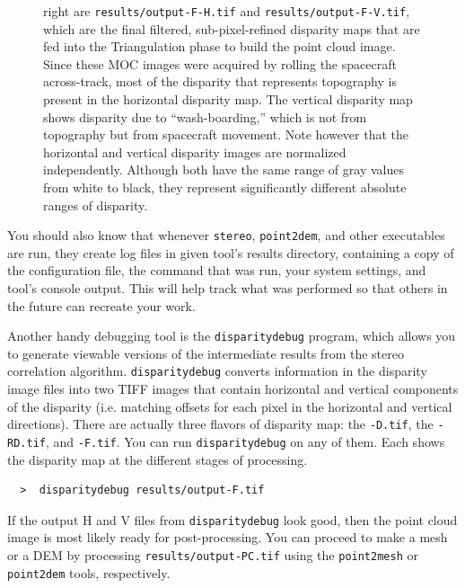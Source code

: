 \begin{figure}[b!]
\begin{minipage}{2.7in}
{        right are \texttt{results/output-F-H.tif} and
        \texttt{results/output-F-V.tif}, which are the final
        filtered, sub-pixel-refined disparity maps that are fed into the
        Triangulation phase to build the point cloud image.  Since
        these MOC images were acquired by rolling the spacecraft
        across-track, most of the disparity that represents topography
        is present in the horizontal disparity map.  The vertical
        disparity map shows disparity due to ``wash-boarding,'' which
        is not from topography but from spacecraft movement. Note
        however that the horizontal and vertical disparity images are
        normalized independently.  Although both have the same range
        of gray values from white to black, they represent
        significantly different absolute ranges of disparity.}
\end{minipage}
\end{figure}

You should also know that whenever \texttt{stereo}, \texttt{point2dem},
and other executables are run, they create log files in given tool's
results directory, containing a copy of the configuration file, the
command that was run, your system settings, and tool's console
output. This will help track what was performed so that others in the
future can recreate your work.

Another handy debugging tool is the \texttt{disparitydebug} program,
which allows you to generate viewable versions of the intermediate
results from the stereo correlation algorithm.
\texttt{disparitydebug} converts information in the disparity image
files into two TIFF images that contain horizontal and vertical
components of the disparity (i.e. matching offsets for each pixel in
the horizontal and vertical directions).  There are actually three
flavors of disparity map: the \texttt{-D.tif}, the \texttt{-RD.tif},
and \texttt{-F.tif}.  You can run \texttt{disparitydebug} on any of
them.  Each shows the disparity map at the different stages of
processing.

\begin{verbatim}
  >  disparitydebug results/output-F.tif
\end{verbatim}

If the output H and V files from \texttt{disparitydebug} look good,
then the point cloud image is most likely ready for post-processing.
You can proceed to make a mesh or a \ac{DEM} by processing
\texttt{results/output-PC.tif} using the \texttt{point2mesh} or
\texttt{point2dem} tools, respectively.

